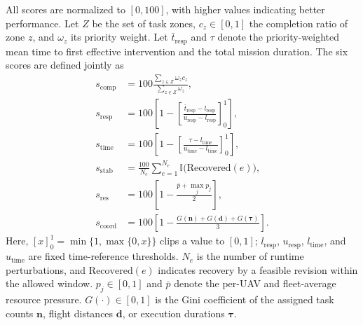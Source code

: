 All scores are normalized to $[0,100]$, with higher values indicating better
performance. Let $Z$ be the set of task zones, $c_z\in[0,1]$ the completion
ratio of zone $z$, and $\omega_z$ its priority weight. Let
$\bar t_{\mathrm{resp}}$ and $\tau$ denote the priority-weighted mean time to
first effective intervention and the total mission duration. The six scores are
defined jointly as
\begin{equation}
\begin{aligned}
s_{\mathrm{comp}}
&=100\frac{\sum_{z\in Z}\omega_zc_z}
 {\sum_{z\in Z}\omega_z},\\
s_{\mathrm{resp}}
&=100\left[1-
\left[\frac{\bar t_{\mathrm{resp}}-l_{\mathrm{resp}}}
 {u_{\mathrm{resp}}-l_{\mathrm{resp}}}\right]_0^1\right],\\
s_{\mathrm{time}}
&=100\left[1-
\left[\frac{\tau-l_{\mathrm{time}}}
 {u_{\mathrm{time}}-l_{\mathrm{time}}}\right]_0^1\right],\\
s_{\mathrm{stab}}
&=\frac{100}{N_e}\sum_{e=1}^{N_e}
 \mathbb{I}\bigl(\mathrm{Recovered}(e)\bigr),\\
s_{\mathrm{res}}
 &=100\left[1-\frac{\bar p+\max_jp_j}{2}\right],\\
s_{\mathrm{coord}}
&=100\left[1-
\frac{G(\mathbf{n})+G(\mathbf{d})+G(\boldsymbol{\tau})}{3}\right].
\end{aligned}
\label{eq:mission-level-scores}
\end{equation}
Here, $[x]_0^1=\min\{1,\max\{0,x\}\}$ clips a value to $[0,1]$;
$l_{\mathrm{resp}}$, $u_{\mathrm{resp}}$, $l_{\mathrm{time}}$, and
$u_{\mathrm{time}}$ are fixed time-reference thresholds. $N_e$ is the number
of runtime perturbations, and $\mathrm{Recovered}(e)$ indicates recovery by a
feasible revision within the allowed window. $p_j\in[0,1]$ and $\bar p$ denote
the per-UAV and fleet-average resource pressure. $G(\cdot)\in[0,1]$ is the
Gini coefficient of the assigned task counts $\mathbf{n}$, flight distances
$\mathbf{d}$, or execution durations $\boldsymbol{\tau}$.

